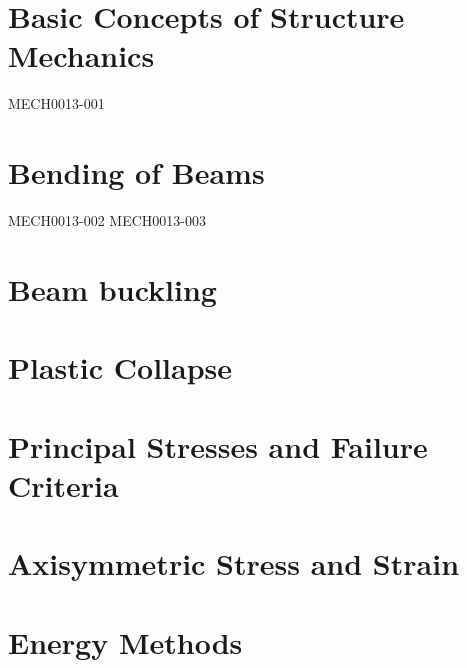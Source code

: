 \documentclass[12pt]{report}
\numberwithin{equation}{section}
\begin{document}
\chapter{Basic Concepts of Structure Mechanics}
{MECH0013-001}
\chapter{Bending of Beams}
{MECH0013-002}
{MECH0013-003}

\chapter{Beam buckling}
\chapter{Plastic Collapse}
\chapter{Principal Stresses and Failure Criteria}
\chapter{Axisymmetric Stress and Strain}
\chapter{Energy Methods}
\end{document}
